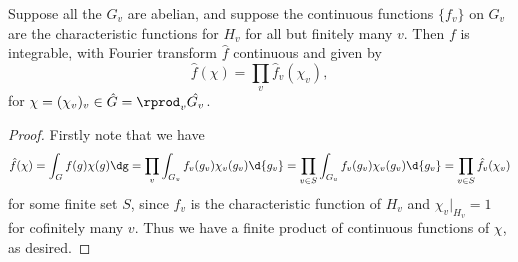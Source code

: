 \documentclass[11pt, x11names, openany]{book}
\begin{document}
\begin{prop}
\label{prop: Fourier Transform on restricted product is integrable}
Suppose all the $G_v$ are abelian, and suppose the continuous functions $\{f_v\}$ on $G_v$ are the characteristic functions for $H_v$ for all but finitely many $v$. Then $f$ is integrable, with Fourier transform $\hat{f}$ continuous and given by
\begin{equation*}
    \hat{f}(\chi) = \prod_v \hat{f}_v(\chi_v),
\end{equation*}
for $\chi = (\chi_v)_v \in \hat{G} = \rprod_v \hat{G_v}$.
\end{prop}
\begin{proof}
Firstly note that we have
\begin{equation*}
    \hat{f}(\chi) = \int_G f(g) \chi(g) \dg = \prod_v \int_{G_v}f_v(g_v) \chi_v(g_v) \d{g_v} = \prod_{v \in S} \int_{G_v} f_v(g_v) \chi_v(g_v) \d{g_v} = \prod_{v \in S} \hat{f_v}(\chi_v)
\end{equation*}
for some finite set $S$, since $f_v$ is the characteristic function of $H_v$ and $\chi_v \vert_{H_v} = 1$ for cofinitely many $v$. Thus we have a finite product of continuous functions of $\chi$, as desired.
\end{proof}
\end{document}
